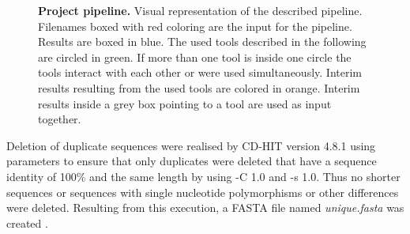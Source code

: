     \begin{figure}[!hbt]
        \centering
        \caption[Project pipeline]{\textbf{Project pipeline.} Visual representation of the described pipeline. Filenames boxed with red coloring are the input for the pipeline. Results are boxed in blue. The used tools described in the following are circled in green. If more than one tool is inside one circle the tools interact with each other or were used simultaneously. Interim results resulting from the used tools are colored in orange. Interim results inside a grey box pointing to a tool are used as input together.}
        \label{fig:2.1}
    \end{figure}
    
    Deletion of duplicate sequences were realised by CD-HIT version 4.8.1 using parameters to ensure that only duplicates were deleted that have a sequence identity of 100\% and the same length by using \colorbox{backcolour}{-C 1.0} and \colorbox{backcolour}{-s 1.0}. Thus no shorter sequences or sequences with single nucleotide polymorphisms or other differences were deleted. Resulting from this execution, a FASTA file named \textit{unique.fasta} was created \autocite{CD-HIT}.  
    
